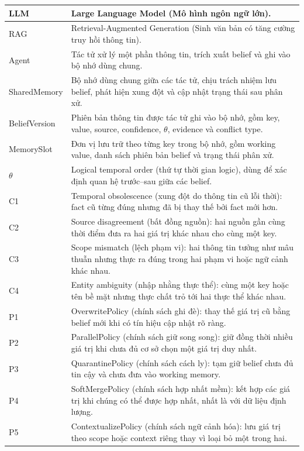 \documentclass[12pt,a4paper]{article}
\begin{document}
\begin{longtable}{|p{}|p{}|}
LLM & Large Language Model (Mô hình ngôn ngữ lớn). \\
\hline
RAG & Retrieval-Augmented Generation (Sinh văn bản có tăng cường truy hồi thông tin). \\
\hline
Agent & Tác tử xử lý một phần thông tin, trích xuất belief và ghi vào bộ nhớ dùng chung. \\
\hline
SharedMemory & Bộ nhớ dùng chung giữa các tác tử, chịu trách nhiệm lưu belief, phát hiện xung đột và cập nhật trạng thái sau phân xử. \\
\hline
BeliefVersion & Phiên bản thông tin được tác tử ghi vào bộ nhớ, gồm key, value, source, confidence, \(\theta\), evidence và conflict type. \\
\hline
MemorySlot & Đơn vị lưu trữ theo từng key trong bộ nhớ, gồm working value, danh sách phiên bản belief và trạng thái phân xử. \\
\hline
\(\theta\) & Logical temporal order (thứ tự thời gian logic), dùng để xác định quan hệ trước--sau giữa các belief. \\
\hline
C1 & Temporal obsolescence (xung đột do thông tin cũ lỗi thời): fact cũ từng đúng nhưng đã bị thay thế bởi fact mới hơn. \\
\hline
C2 & Source disagreement (bất đồng nguồn): hai nguồn gần cùng thời điểm đưa ra hai giá trị khác nhau cho cùng một key. \\
\hline
C3 & Scope mismatch (lệch phạm vi): hai thông tin tưởng như mâu thuẫn nhưng thực ra đúng trong hai phạm vi hoặc ngữ cảnh khác nhau. \\
\hline
C4 & Entity ambiguity (nhập nhằng thực thể): cùng một key hoặc tên bề mặt nhưng thực chất trỏ tới hai thực thể khác nhau. \\
\hline
P1 & OverwritePolicy (chính sách ghi đè): thay thế giá trị cũ bằng belief mới khi có tín hiệu cập nhật rõ ràng. \\
\hline
P2 & ParallelPolicy (chính sách giữ song song): giữ đồng thời nhiều giá trị khi chưa đủ cơ sở chọn một giá trị duy nhất. \\
\hline
P3 & QuarantinePolicy (chính sách cách ly): tạm giữ belief chưa đủ tin cậy và chưa đưa vào working memory. \\
\hline
P4 & SoftMergePolicy (chính sách hợp nhất mềm): kết hợp các giá trị khi chúng có thể được hợp nhất, nhất là với dữ liệu định lượng. \\
\hline
P5 & ContextualizePolicy (chính sách ngữ cảnh hóa): lưu giá trị theo scope hoặc context riêng thay vì loại bỏ một trong hai. \\

\end{longtable}
\end{document}
